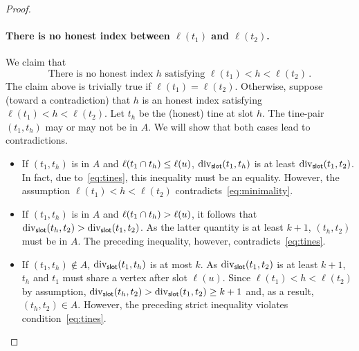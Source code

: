 \begin{proof}
    \paragraph{There is no honest index between $\ell(t_1)$ and $\ell(t_2)$.}
    We claim that 
    \begin{equation}\label{eq:no-honest-index}
        \text{There is no honest index $h$ satisfying $\ell(t_1) < h < \ell(t_2)$}
        \,.
    \end{equation}
    The claim above is trivially true if $\ell(t_1) = \ell(t_2)$.
    Otherwise, suppose (toward a contradiction) 
    that $h$ is an honest index satisfying $\ell(t_1) < h < \ell(t_2)$. 
    Let $t_h$ be the (honest) tine at slot $h$. 
    The tine-pair $(t_1, t_h)$ may or may not be in $A$. 
    We will show that both cases lead to contradictions.
    \begin{itemize}
      \item If $(t_1, t_h)$ is in $A$ and $\ell(t_1 \cap t_h) \leq \ell(u)$, 
      $\mathrm{div}_{\mathsf{slot}}(t_1, t_h)$ is at least $\mathrm{div}_{\mathsf{slot}}(t_1, t_2)$. 
      In fact, due to~\eqref{eq:tines}, this inequality must be an equality. 
      However, the assumption $\ell(t_1) < h < \ell(t_2)$ contradicts~\eqref{eq:minimality}. 

      \item If $(t_1, t_h)$ is in $A$ and $\ell(t_1 \cap t_h) > \ell(u)$, 
      it follows that $\mathrm{div}_{\mathsf{slot}}(t_h, t_2) > \mathrm{div}_{\mathsf{slot}}(t_1, t_2)$. 
      As the latter quantity is at least $k + 1$, $(t_h, t_2)$ must be in $A$. 
      The preceding inequality, however, contradicts~\eqref{eq:tines}.

      \item If $(t_1, t_h) \not \in A$, 
      $\mathrm{div}_{\mathsf{slot}}(t_1, t_h)$ is at most $k$.
      As $\mathrm{div}_{\mathsf{slot}}(t_1, t_2)$ is at least $k + 1$, 
      $t_h$ and $t_1$ must share a vertex after slot $\ell(u)$. 
      Since $\ell(t_1) < h < \ell(t_2)$ by assumption, 
      $\mathrm{div}_{\mathsf{slot}}(t_h, t_2) > \mathrm{div}_{\mathsf{slot}}(t_1, t_2) \geq k + 1$ 
      and, as a result, $(t_h, t_2) \in A$. 
      However, the preceding strict inequality violates condition~\eqref{eq:tines}. 
    \end{itemize}
    
    





\end{proof}
